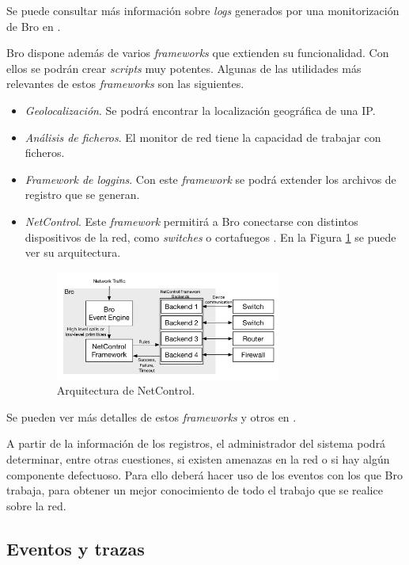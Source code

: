 \intro Se puede consultar más información sobre \textit{logs} generados por una monitorización de Bro en \cite{brologs}.

\intro Bro dispone además de varios \textit{frameworks} que extienden su funcionalidad. Con ellos se podrán crear \textit{scripts} muy potentes. Algunas de las utilidades más relevantes de estos \textit{frameworks} son las siguientes.
\begin{itemize}
\item \textit{Geolocalización}. Se podrá encontrar la localización geográfica de una IP.
\item \textit{Análisis de ficheros}. El monitor de red tiene la capacidad de trabajar con ficheros.
\item \textit{Framework de loggins}. Con este \textit{framework} se podrá extender los archivos de registro que se generan.
\item \textit{NetControl}. Este \textit{framework} permitirá a Bro conectarse con distintos dispositivos de la red, como 
\textit{switches} o cortafuegos \cite{bronetcontrol}. En la Figura \ref{fig.netcontrol} se puede ver su arquitectura.
\begin{figure}[H]
  \includegraphics[width=0.7\textwidth]{imagenes/netcarquitectura.png}
  \centering
  \caption{Arquitectura de NetControl.}\label{fig.netcontrol}
\end{figure}
\end{itemize}


\intro Se pueden ver más detalles de estos \textit{frameworks} y otros en \cite{broframeworks}.

\intro A partir de la información de los registros, el administrador del sistema podrá determinar, entre otras cuestiones, si existen 
amenazas en la red o si hay algún componente defectuoso. Para ello deberá hacer uso de los eventos con los que Bro trabaja, para 
obtener un mejor conocimiento de todo el trabajo que se realice sobre la red.

\subsection{Eventos y trazas}

